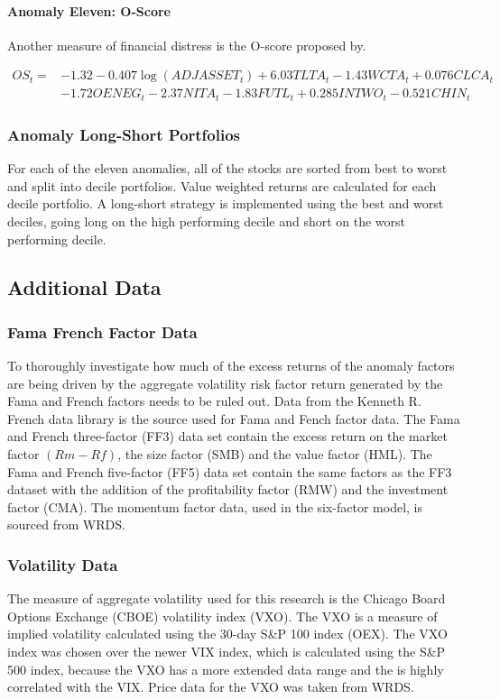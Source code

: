 \documentclass[12pt, a4paper, oneside]{article}
\begin{document}
\paragraph*{Anomaly Eleven: O-Score}
Another measure of financial distress is the O-score proposed by\cite{ohlson1980financial}.

\begin{align*}
    OS_t = &- 1.32 - 0.407 \log (ADJASSET_t )  + 6.03 TLTA_t- 1.43 WCTA_t+ 0.076 CLCA_t \\
    &- 1.72O ENEG_t- 2.37 NITA_t- 1.83 FUTL_t+ 0.285 INTWO_t- 0.521 CHIN_t
\end{align*}

\subsubsection{Anomaly Long-Short Portfolios}
For each of the eleven anomalies, all of the stocks are sorted from best to worst and split into decile portfolios. Value weighted returns are calculated for each decile portfolio. A long-short strategy is implemented using the best and worst deciles, going long on the high performing decile and short on the worst performing decile. 

\subsection{Additional Data}
\subsubsection{Fama French Factor Data}
To thoroughly investigate how much of the excess returns of the anomaly factors are being driven by the aggregate volatility risk factor return generated by the Fama and French factors needs to be ruled out. Data from the Kenneth R. French data library is the source used for Fama and Fench factor data. The Fama and French three-factor (FF3) data set contain the excess return on the market factor $(Rm - Rf)$, the size factor (SMB) and the value factor (HML). The Fama and French five-factor (FF5) data set contain the same factors as the FF3 dataset with the addition of the profitability factor (RMW) and the investment factor (CMA). The momentum factor data, used in the six-factor model, is sourced from WRDS.

\subsubsection{Volatility Data}
The measure of aggregate volatility used for this research is the Chicago Board Options Exchange (CBOE) volatility index (VXO). The VXO is a measure of implied volatility calculated using the 30-day S\&P 100 index (OEX). The VXO index was chosen over the newer VIX index, which is calculated using the S\&P 500 index, because the VXO has a more extended data range and the is highly correlated with the VIX. Price data for the VXO was taken from WRDS.
\end{document}
